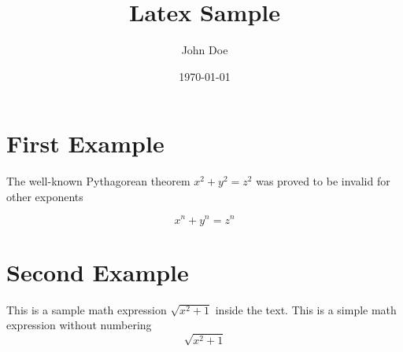 \documentclass{article}
\title{Latex Sample}
\author{John Doe}
\date{\today}
\begin{document}
	\maketitle
	
	\section{First Example}
	The well-known Pythagorean theorem $ x^2 + y^2 = z^2 $ was proved to be invalid for other exponents
	
	\[ x^n + y^n = z^n \]
	
	\section{Second Example}
	This is a sample math expression $ \sqrt{x^2 + 1} $ inside the text.
	This is a simple math expression without numbering
	\[ \sqrt{x^2 + 1}  \]
\end{document}
